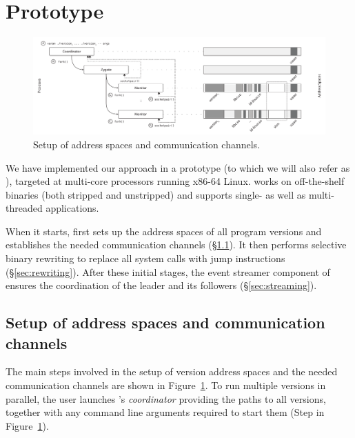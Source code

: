 \section{Prototype}
\label{sec:prototype}


\begin{figure}[t]
  \begin{center}
    \includegraphics[width=\textwidth]{efficient-execution/figures/address-space}
    \caption{Setup of address spaces and communication channels.}
    \label{fig:setup}
  \end{center}
\end{figure}


We have implemented our approach in a prototype (to which we will also
refer as \varan), targeted at multi-core processors running x86-64 Linux.
\varan works on off-the-shelf binaries (both stripped and unstripped)
and supports single- as well as multi-threaded applications.

When it starts, \varan first sets up the address spaces of all program
versions and establishes the needed communication channels
(\S\ref{sec:setup}).  It then performs selective binary rewriting to
replace all system calls with  jump instructions
(\S\ref{sec:rewriting}).  After these initial stages, the event
streamer component of \varan ensures the coordination of the leader and
its followers (\S\ref{sec:streaming}).


\subsection{Setup of address spaces and communication channels}
\label{sec:setup}

The main steps involved in the setup of version address spaces and the
needed communication channels are shown in Figure~\ref{fig:setup}.  To
run multiple versions in parallel, the user launches \varan's
\emph{coordinator} providing the paths to all versions, together with
any command line arguments required to start them (Step  in
Figure~\ref{fig:setup}).

